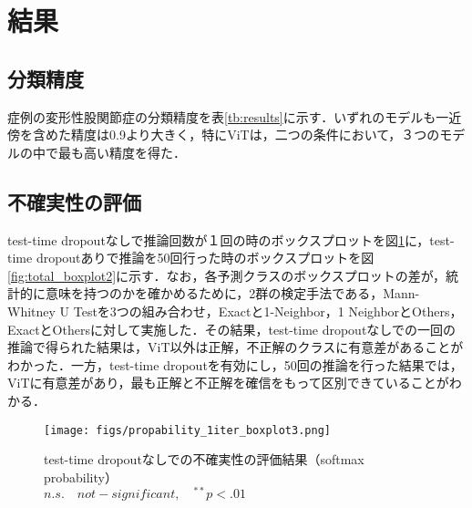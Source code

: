 \documentclass[technicalreport]{ieicej}
\begin{document}
\section{結果}
\subsection{分類精度}
症例の変形性股関節症の分類精度を表\ref{tb:results}に示す．いずれのモデルも一近傍を含めた精度は0.9より大きく，特にViTは，二つの条件において，３つのモデルの中で最も高い精度を得た．

\begin{table}[h]
  \caption{自動分類結果}
  \label{tb:results}
\end{table}

\subsection{不確実性の評価}
test-time dropoutなしで推論回数が１回の時のボックスプロットを図\ref{fig:total_boxplot1}に，test-time dropoutありで推論を50回行った時のボックスプロットを図\ref{fig:total_boxplot2}に示す．なお，各予測クラスのボックスプロットの差が，統計的に意味を持つのかを確かめるために，2群の検定手法である，Mann-Whitney U Testを3つの組み合わせ，Exactと1-Neighbor，1 NeighborとOthers，ExactとOthersに対して実施した．その結果，test-time dropoutなしでの一回の推論で得られた結果は，ViT以外は正解，不正解のクラスに有意差があることがわかった．一方，test-time dropoutを有効にし，50回の推論を行った結果では，ViTに有意差があり，最も正解と不正解を確信をもって区別できていることがわかる．
\begin{figure}[h]
\capwidth=60mm
\vspace{50mm}
\hspace{5}
\texttt{[image: figs/propability\_1iter\_boxplot3.png]}
\caption{test-time dropoutなしでの不確実性の評価結果（softmax probability）\\$n.s. \quad not-significant,\quad^{**}p<.01$}
\label{fig:total_boxplot1}
\end{figure}
\end{document}

